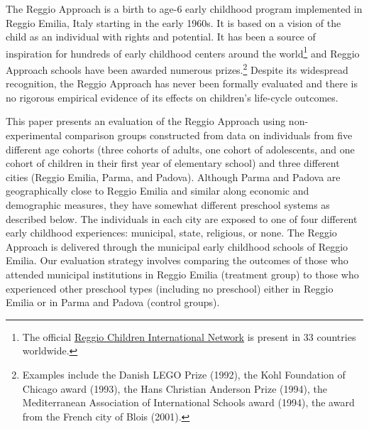 The Reggio Approach is a birth to age-6 early childhood program implemented in Reggio Emilia, Italy starting in the early 1960s. It is based on a vision of the child as an individual with rights and potential. It has been a source of inspiration for hundreds of early childhood centers around the world\footnote{The official \href{http://www.reggiochildren.it/network/?lang=en}{Reggio Children International Network} is present in 33 countries worldwide.} and Reggio Approach schools have been awarded numerous prizes.\footnote{Examples include the Danish LEGO Prize (1992), the Kohl Foundation of Chicago award (1993), the Hans Christian Anderson Prize (1994), the Mediterranean Association of International Schools award (1994), the award from the French city of Blois (2001).} Despite its widespread recognition, the Reggio Approach has never been formally evaluated and there is no rigorous empirical evidence of its effects on children's life-cycle outcomes.

This paper presents an evaluation of the Reggio Approach using non-experimental comparison groups constructed from data on individuals from five different age cohorts (three cohorts of adults, one cohort of adolescents, and one cohort of children in their first year of elementary school) and three different cities (Reggio Emilia, Parma, and Padova). Although Parma and Padova are geographically close to Reggio Emilia and similar along economic and demographic measures, they have somewhat different preschool systems as described below. The individuals in each city are exposed to one of four different early childhood experiences: municipal, state, religious, or none. The Reggio Approach is delivered through the municipal early childhood schools of Reggio Emilia. Our evaluation strategy involves comparing the outcomes of those who attended municipal institutions in Reggio Emilia (treatment group) to those who experienced other preschool types (including no preschool) either in Reggio Emilia or in Parma and Padova (control groups).

